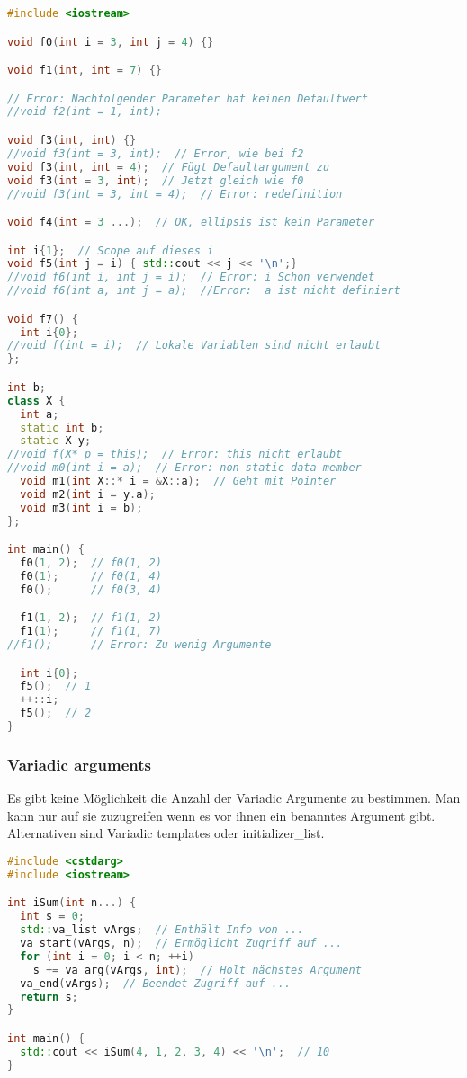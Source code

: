 \begin{lstlisting}[language=C++]
#include <iostream>

void f0(int i = 3, int j = 4) {}

void f1(int, int = 7) {}

// Error: Nachfolgender Parameter hat keinen Defaultwert
//void f2(int = 1, int);

void f3(int, int) {}
//void f3(int = 3, int);  // Error, wie bei f2
void f3(int, int = 4);  // Fügt Defaultargument zu
void f3(int = 3, int);  // Jetzt gleich wie f0
//void f3(int = 3, int = 4);  // Error: redefinition

void f4(int = 3 ...);  // OK, ellipsis ist kein Parameter

int i{1};  // Scope auf dieses i
void f5(int j = i) { std::cout << j << '\n';}
//void f6(int i, int j = i);  // Error: i Schon verwendet
//void f6(int a, int j = a);  //Error:  a ist nicht definiert

void f7() {
  int i{0};
//void f(int = i);  // Lokale Variablen sind nicht erlaubt
};

int b;
class X {
  int a;
  static int b;
  static X y;
//void f(X* p = this);  // Error: this nicht erlaubt
//void m0(int i = a);  // Error: non-static data member
  void m1(int X::* i = &X::a);  // Geht mit Pointer
  void m2(int i = y.a);
  void m3(int i = b);
};

int main() {
  f0(1, 2);  // f0(1, 2)
  f0(1);     // f0(1, 4)
  f0();      // f0(3, 4)

  f1(1, 2);  // f1(1, 2)
  f1(1);     // f1(1, 7)
//f1();      // Error: Zu wenig Argumente

  int i{0};
  f5();  // 1
  ++::i;
  f5();  // 2
}
\end{lstlisting}

\subsubsection{Variadic arguments}

Es gibt keine Möglichkeit die Anzahl der Variadic Argumente zu bestimmen. Man
kann nur auf sie zuzugreifen wenn es vor ihnen ein benanntes Argument gibt.
Alternativen sind Variadic templates oder initializer\_list.

\begin{lstlisting}[language=C++]
#include <cstdarg>
#include <iostream>

int iSum(int n...) {
  int s = 0;
  std::va_list vArgs;  // Enthält Info von ...
  va_start(vArgs, n);  // Ermöglicht Zugriff auf ...
  for (int i = 0; i < n; ++i)
    s += va_arg(vArgs, int);  // Holt nächstes Argument
  va_end(vArgs);  // Beendet Zugriff auf ...
  return s;
}

int main() {
  std::cout << iSum(4, 1, 2, 3, 4) << '\n';  // 10
}
\end{lstlisting}

